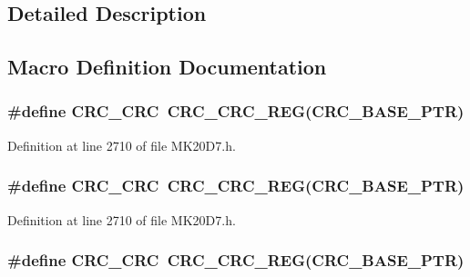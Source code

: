 \subsection{Detailed Description}


\subsection{Macro Definition Documentation}
\subsubsection[{\texorpdfstring{C\+R\+C\+\_\+\+C\+RC}{CRC_CRC}}]{\setlength{\rightskip}{0pt plus 5cm}\#define C\+R\+C\+\_\+\+C\+RC~{\bf C\+R\+C\+\_\+\+C\+R\+C\+\_\+\+R\+EG}({\bf C\+R\+C\+\_\+\+B\+A\+S\+E\+\_\+\+P\+TR})}\hypertarget{group___c_r_c___register___accessor___macros_ga99e479e85b3b249fd5c296fa60993b19}{}\label{group___c_r_c___register___accessor___macros_ga99e479e85b3b249fd5c296fa60993b19}


Definition at line 2710 of file M\+K20\+D7.\+h.

\subsubsection[{\texorpdfstring{C\+R\+C\+\_\+\+C\+RC}{CRC_CRC}}]{\setlength{\rightskip}{0pt plus 5cm}\#define C\+R\+C\+\_\+\+C\+RC~{\bf C\+R\+C\+\_\+\+C\+R\+C\+\_\+\+R\+EG}({\bf C\+R\+C\+\_\+\+B\+A\+S\+E\+\_\+\+P\+TR})}\hypertarget{group___c_r_c___register___accessor___macros_ga99e479e85b3b249fd5c296fa60993b19}{}\label{group___c_r_c___register___accessor___macros_ga99e479e85b3b249fd5c296fa60993b19}


Definition at line 2710 of file M\+K20\+D7.\+h.

\subsubsection[{\texorpdfstring{C\+R\+C\+\_\+\+C\+RC}{CRC_CRC}}]{\setlength{\rightskip}{0pt plus 5cm}\#define C\+R\+C\+\_\+\+C\+RC~{\bf C\+R\+C\+\_\+\+C\+R\+C\+\_\+\+R\+EG}({\bf C\+R\+C\+\_\+\+B\+A\+S\+E\+\_\+\+P\+TR})}\hypertarget{group___c_r_c___register___accessor___macros_ga99e479e85b3b249fd5c296fa60993b19}{}\label{group___c_r_c___register___accessor___macros_ga99e479e85b3b249fd5c296fa60993b19}


